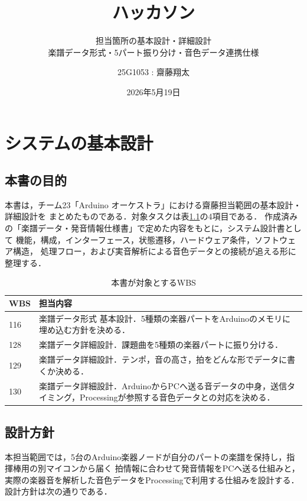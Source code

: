 \documentclass[lualatex,book,paper=a4paper,jafontsize=11.5pt,jafontscale=1.05]{jlreq}
\title{ハッカソン}
\subtitle{担当箇所の基本設計・詳細設計\\楽譜データ形式・5パート振り分け・音色データ連携仕様}
\author{25G1053 : 齋藤翔太}
\date{2026年5月19日}
\begin{document}
\maketitle

\setcounter{tocdepth}{2}
\tableofcontents \thispagestyle{empty}

\chapter{システムの基本設計}\label{chap:saito-basic-design}\setcounter{page}{1}

\section{本書の目的}
本書は，チーム23「Arduino オーケストラ」における齋藤担当範囲の基本設計・詳細設計を
まとめたものである．対象タスクは表\ref{tab:saito-wbs-scope}の4項目である．
作成済みの「楽譜データ・発音情報仕様書」で定めた内容をもとに，システム設計書として
機能，構成，インターフェース，状態遷移，ハードウェア条件，ソフトウェア構造，
処理フロー，および実音解析による音色データとの接続が追える形に整理する．

\begin{table}[H]
\centering
\caption{本書が対象とするWBS}
\label{tab:saito-wbs-scope}
\begin{tabular}{p{}p{}}
\toprule
\textbf{WBS} & \textbf{担当内容} \\
\midrule
116 & 楽譜データ形式 基本設計．5種類の楽器パートをArduinoのメモリに埋め込む方針を決める．\\
128 & 楽譜データ詳細設計．課題曲を5種類の楽器パートに振り分ける．\\
129 & 楽譜データ詳細設計．テンポ，音の高さ，拍をどんな形でデータに書くか決める．\\
130 & 楽譜データ詳細設計．ArduinoからPCへ送る音データの中身，送信タイミング，Processingが参照する音色データとの対応を決める．\\
\bottomrule
\end{tabular}
\end{table}

\section{設計方針}

本担当範囲では，5台のArduino楽器ノードが自分のパートの楽譜を保持し，指揮棒用の別マイコンから届く
拍情報に合わせて発音情報をPCへ送る仕組みと，実際の楽器音を解析した音色データをProcessingで利用する仕組みを設計する．
設計方針は次の通りである．
\end{document}
